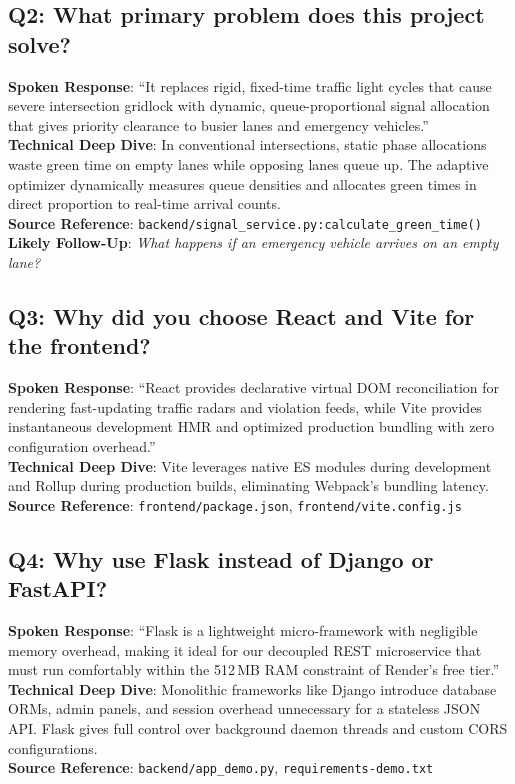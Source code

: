 \documentclass[11pt,a4paper,oneside]{report}
\begin{document}
\subsection*{Q2: What primary problem does this project solve?}
\begin{interviewbox}
\textbf{Spoken Response}: ``It replaces rigid, fixed-time traffic light cycles that cause severe intersection gridlock with dynamic, queue-proportional signal allocation that gives priority clearance to busier lanes and emergency vehicles.''\\
\textbf{Technical Deep Dive}: In conventional intersections, static phase allocations waste green time on empty lanes while opposing lanes queue up. The adaptive optimizer dynamically measures queue densities and allocates green times in direct proportion to real-time arrival counts.\\
\textbf{Source Reference}: \texttt{backend/signal\_service.py:calculate\_green\_time()}\\
\textbf{Likely Follow-Up}: \textit{What happens if an emergency vehicle arrives on an empty lane?}
\end{interviewbox}

\subsection*{Q3: Why did you choose React and Vite for the frontend?}
\begin{interviewbox}
\textbf{Spoken Response}: ``React provides declarative virtual DOM reconciliation for rendering fast-updating traffic radars and violation feeds, while Vite provides instantaneous development HMR and optimized production bundling with zero configuration overhead.''\\
\textbf{Technical Deep Dive}: Vite leverages native ES modules during development and Rollup during production builds, eliminating Webpack's bundling latency.\\
\textbf{Source Reference}: \texttt{frontend/package.json}, \texttt{frontend/vite.config.js}
\end{interviewbox}

\subsection*{Q4: Why use Flask instead of Django or FastAPI?}
\begin{interviewbox}
\textbf{Spoken Response}: ``Flask is a lightweight micro-framework with negligible memory overhead, making it ideal for our decoupled REST microservice that must run comfortably within the 512\,MB RAM constraint of Render's free tier.''\\
\textbf{Technical Deep Dive}: Monolithic frameworks like Django introduce database ORMs, admin panels, and session overhead unnecessary for a stateless JSON API. Flask gives full control over background daemon threads and custom CORS configurations.\\
\textbf{Source Reference}: \texttt{backend/app\_demo.py}, \texttt{requirements-demo.txt}
\end{interviewbox}
\end{document}
